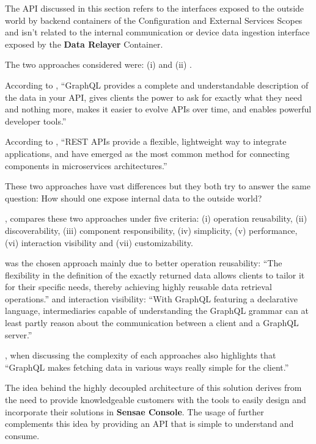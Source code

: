 The \gls{API} discussed in this section refers to the interfaces exposed to the outside world by backend containers of the Configuration and External Services Scopes and isn't related to the internal communication or device data ingestion interface exposed by the \textbf{Data Relayer} Container.

The two approaches considered were: (i)  and (ii) .

According to \cite{graphql}, ``GraphQL provides a complete and understandable description of the data in your API, gives clients the power to ask for exactly what they need and nothing more, makes it easier to evolve APIs over time, and enables powerful developer tools.''

According to \cite{rest}, ``REST APIs provide a flexible, lightweight way to integrate applications, and have emerged as the most common method for connecting components in microservices architectures.''

These two approaches have vast differences but they both try to answer the same question: How should one expose internal data to the outside world?

\cite{eizinger2017api}, compares these two approaches under five criteria: (i) operation reusability, (ii) discoverability, (iii) component responsibility, (iv) simplicity, (v) performance, (vi) interaction visibility and (vii) customizability.

 was the chosen approach mainly due to better operation reusability: ``The flexibility in the definition of the exactly returned data allows clients to tailor it for their specific needs, thereby achieving highly reusable data retrieval operations.'' and interaction visibility: ``With GraphQL featuring a declarative language, intermediaries capable of understanding the GraphQL grammar can at least partly reason about the communication between a client and a GraphQL server.''

\cite{eizinger2017api}, when discussing the complexity of each approaches also highlights that ``GraphQL makes fetching data in various ways really simple for the client.''

The idea behind the highly decoupled architecture of this solution derives from the need to provide knowledgeable customers with the tools to easily design and incorporate their solutions in \textbf{Sensae Console}. The usage of  further complements this idea by providing an API that is simple to understand and consume.

